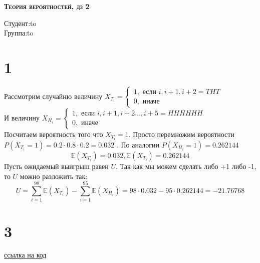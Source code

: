 
	
	\begin{titlepage}
		
		
		\begin{center}
			\textsc{\textbf{Теория вероятностей, дз 2}}
		\end{center}
		
		\vspace{6em}
		
		
		
		\newbox{\lbox}
		\newlength{\maxl}
		\setlength{\maxl}{\wd\lbox}
		\hfill\parbox{11cm}{
			\hspace*{5cm}\hspace*{-5cm}Студент:\hfill\hbox to\\
			\hspace*{5cm}\hspace*{-5cm}Группа:\hfill\hbox to\\
		}
		
		
		
	\end{titlepage}
	\section*{1}
	Рассмотрим случайню величину $X_{T_i} = \begin{cases}
		1, \text{ если } i, i+1, i+2 = THT\\
		0,\text{ иначе }
	\end{cases}$ \\
	И величину $X_{H_i} = \begin{cases}
		1, \text{ если } i, i+1, i+2\dots , i+5= HHHHHH\\
		0,\text{ иначе }
	\end{cases}$\\
	Посчитаем вероятность того что $X_{T_i}=1$. Просто перемножим вероятности $P(X_{T_i}=1 ) = 0.2\cdot0.8\cdot0.2 = 0.032$ . По аналогии  $P(X_{H_i}=1 ) =0.262144 $\\
	$$\mathbb{E}(X_{T_i}) =0.032,\mathbb{E}(X_{T_i}) =0.262144 $$
	Пусть ожидаемый выигрыш равен $U$. Так как мы можем сделать либо +1 либо -1, то $U$ можно разложить так: $$U = \sum\limits_{i=1}^{98} \mathbb{E}(X_{T_i}) - \sum\limits_{i=1}^{95} \mathbb{E}(X_{H_i})  = 98\cdot0.032- 95\cdot 0.262144 =-21.76768$$
	\section*{3}
	\href{https://pastebin.com/AfR4trVC}{ссылка на код}
